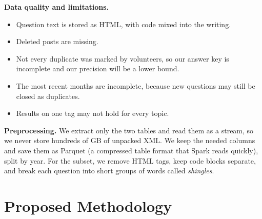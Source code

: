 \documentclass[11pt,a4paper]{article}
\begin{document}
\textbf{Data quality and limitations.}
\begin{itemize}
  \item Question text is stored as HTML, with code mixed into the writing.
  \item Deleted posts are missing.
  \item Not every duplicate was marked by volunteers, so our answer key is
        incomplete and our precision will be a lower bound.
  \item The most recent months are incomplete, because new questions may still
        be closed as duplicates.
  \item Results on one tag may not hold for every topic.
\end{itemize}

\textbf{Preprocessing.} We extract only the two tables and read them as a
stream, so we never store hundreds of GB of unpacked XML. We keep the needed
columns and save them as Parquet (a compressed table format that Spark reads
quickly), split by year. For the subset, we remove HTML tags, keep code blocks
separate, and break each question into short groups of words called
\emph{shingles}.

\section{Proposed Methodology}
\end{document}
